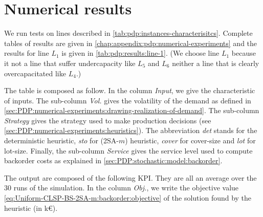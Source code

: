 \section{Numerical results}
\label{sec:PDP:numerical-experiments:numerical-results}


We run tests on lines described in \cref{tab:pdp:instances-characterisitcs}.
Complete tables of results are given in \cref{chap:appendix:pdp:numerical-experiments} and the results for line $L_1$ is given in \cref{tab:pdp:results:line-1}.
(We choose line $L_1$ because it not a line that suffer undercapacity like $L_5$ and $L_6$ neither a line that is clearly overcapacitated like $L_4$.)


The table is composed as follow.
In the column \emph{Input}, we give the characteristic of inputs.
The sub-column \emph{Vol.} gives the volatility of the demand as defined in \cref{sec:PDP:numerical-experiments:drawing-realization-of-demand}.
The sub-column \emph{Strategy} gives the strategy used to make production decisions (see \cref{sec:PDP:numerical-experiments:heuristics}).
The abbreviation \emph{det} stands for the deterministic heuristic, \emph{sto} for (2SA-$m$) heuristic, \emph{cover} for cover-size and \emph{lot} for lot-size.
Finally, the sub-column \emph{Service} gives the service level used to compute backorder costs as explained in \cref{sec:PDP:stochastic:model:backorder}.


The output are composed of the following KPI.
They are all an average over the 30 runs of the simulation.
In the column \emph{Obj.}, we write the objective value \cref{eq:Uniform-CLSP-BS-2SA-m:backorder:objective} of the solution found by the heuristic (in k\euro{}).


